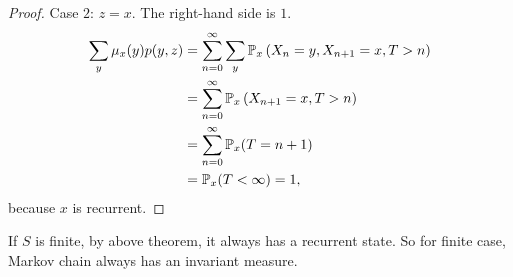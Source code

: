 \begin{proof}
    \noindent Case $2$: $z=x$. The right-hand side is $1$.
    \begin{equation*}
        \begin{aligned}
             \sum_y \mu_x(y)p(y,z) &= \sum_{n=0}^\infty \sum_y \mathbb{P}_x\left(X_n=y, X_{n+1}=x, T>n\right)\\
             &= \sum_{n=0}^\infty \mathbb{P}_x\left(X_{n+1}=x, T>n\right) \\
             &= \sum_{n=0}^\infty \mathbb{P}_x(T = n+1) \\
             &= \mathbb{P}_x(T < \infty) = 1,
        \end{aligned}
    \end{equation*}
    because $x$ is recurrent.
\end{proof}
\begin{rmk}
    If $S$ is finite, by above theorem, it always has a recurrent state. So for finite case, Markov chain always has an invariant measure.
\end{rmk}

